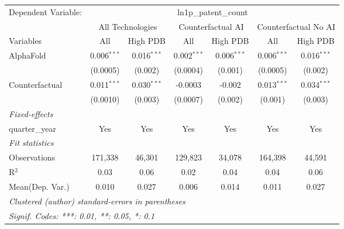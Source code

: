 \begingroup
\centering
\begin{tabular}{lcccccc}
   \tabularnewline \midrule \midrule
   Dependent Variable: & \multicolumn{6}{c}{ln1p\_patent\_count}\\
 & \multicolumn{2}{c}{All Technologies} & \multicolumn{2}{c}{Counterfactual AI} & \multicolumn{2}{c}{Counterfactual No AI} \\
\cmidrule(lr){1-1}\cmidrule(lr){2-3} \cmidrule(lr){4-5} \cmidrule(lr){6-7}
Variables & \multicolumn{1}{c}{All} & \multicolumn{1}{c}{High PDB} & \multicolumn{1}{c}{All} & \multicolumn{1}{c}{High PDB} & \multicolumn{1}{c}{All} & \multicolumn{1}{c}{High PDB} \\
\cmidrule(lr){1-1}\cmidrule(lr){2-2} \cmidrule(lr){3-3} \cmidrule(lr){4-4} \cmidrule(lr){5-5} \cmidrule(lr){6-6} \cmidrule(lr){7-7}
   AlphaFold      & 0.006$^{***}$ & 0.016$^{***}$ & 0.002$^{***}$ & 0.006$^{***}$ & 0.006$^{***}$ & 0.016$^{***}$\\   
                  & (0.0005)      & (0.002)       & (0.0004)      & (0.001)       & (0.0005)      & (0.002)\\   
   Counterfactual & 0.011$^{***}$ & 0.030$^{***}$ & -0.0003       & -0.002        & 0.013$^{***}$ & 0.034$^{***}$\\   
                  & (0.0010)      & (0.003)       & (0.0007)      & (0.002)       & (0.001)       & (0.003)\\   
   \midrule
   \emph{Fixed-effects}\\
   quarter\_year  & Yes           & Yes           & Yes           & Yes           & Yes           & Yes\\  
   \midrule
   \emph{Fit statistics}\\
   Observations   & 171,338       & 46,301        & 129,823       & 34,078        & 164,398       & 44,591\\  
   R$^2$          & 0.03          & 0.06          & 0.02          & 0.04          & 0.04          & 0.06\\  
Mean(Dep. Var.) & 0.010 & 0.027 & 0.006 & 0.014 & 0.011 & 0.027 \\
   \midrule \midrule
   \multicolumn{7}{l}{\emph{Clustered (author) standard-errors in parentheses}}\\
   \multicolumn{7}{l}{\emph{Signif. Codes: ***: 0.01, **: 0.05, *: 0.1}}\\
\end{tabular}
\par\endgroup
